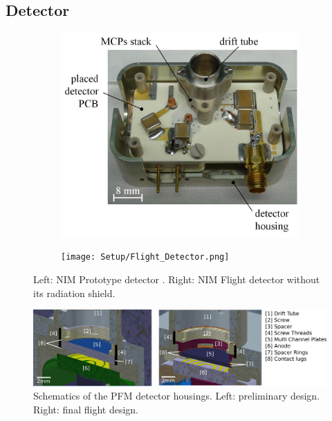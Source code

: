 			

		\subsection{Detector}\label{subsubsec:SetFacPumpst} %
		\begin{figure}[h] %
			\begin{subfigure}{0.5\textwidth}
				\centering
				\includegraphics[width=\textwidth]{Setup/Prototype_Detector.png}
			\end{subfigure}
			\begin{subfigure}{0.5\textwidth}
				\centering
				\texttt{[image: Setup/Flight\_Detector.png]}
			\end{subfigure}
			\caption{Left: NIM Prototype detector \cite{Diss_Meyer}. Right: NIM Flight detector without its radiation shield.}
			\label{fig:DetPhotos}
		\end{figure}
		\begin{figure}[h] %
			\centering
			\includegraphics[width= \textwidth]{Setup/PFMDetectors.png}
			\caption{Schematics of the PFM detector housings. Left: preliminary design. Right: final flight design.}
			\label{fig:FlightDetSchemata}
		\end{figure}
